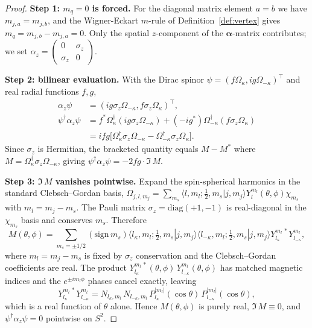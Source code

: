 \documentclass[11pt]{article}
\begin{document}
\begin{proof}
\textbf{Step 1: $m_q = 0$ is forced.}  For the diagonal matrix
element $a = b$ we have $m_{j,a} = m_{j,b}$, and the Wigner-Eckart
$m$-rule of Definition~\ref{def:vertex} gives $m_q = m_{j,b} -
m_{j,a} = 0$.  Only the spatial $z$-component of the
$\boldsymbol{\alpha}$-matrix contributes; we set
$\alpha_z = \begin{pmatrix} 0 & \sigma_z \\ \sigma_z & 0
\end{pmatrix}$.

\textbf{Step 2: bilinear evaluation.}  With the Dirac spinor
$\psi = (f \Omega_\kappa, i g \Omega_{-\kappa})^{\top}$ and real
radial functions $f, g$,
\begin{align*}
   \alpha_z \psi &= (i g \sigma_z \Omega_{-\kappa},
                     f \sigma_z \Omega_\kappa)^{\top}, \\
   \psi^{\dagger} \alpha_z \psi &=
      f^* \Omega_\kappa^{\dagger} (i g \sigma_z \Omega_{-\kappa})
      + (-i g^*) \Omega_{-\kappa}^{\dagger} (f \sigma_z \Omega_\kappa) \\
   &= i fg \bigl[\Omega_\kappa^{\dagger} \sigma_z \Omega_{-\kappa}
      - \Omega_{-\kappa}^{\dagger} \sigma_z \Omega_\kappa\bigr].
\end{align*}
Since $\sigma_z$ is Hermitian, the bracketed quantity equals
$M - M^*$ where $M = \Omega_\kappa^{\dagger} \sigma_z \Omega_{-\kappa}$,
giving $\psi^{\dagger} \alpha_z \psi = -2 fg \cdot \Im\,M$.

\textbf{Step 3: $\Im\,M$ vanishes pointwise.}  Expand the spin-spherical
harmonics in the standard Clebsch--Gordan basis,
$\Omega_{j, l, m_j} = \sum_{m_s} \langle l, m_l; \tfrac{1}{2}, m_s | j,
m_j \rangle Y_l^{m_l}(\theta, \phi) \chi_{m_s}$ with $m_l = m_j - m_s$.
The Pauli matrix $\sigma_z = \mathrm{diag}(+1, -1)$ is real-diagonal in
the $\chi_{m_s}$ basis and conserves $m_s$.  Therefore
\[
   M(\theta, \phi)
   = \sum_{m_s = \pm 1/2} (\mathrm{sign}\,m_s)
     \langle l_\kappa, m_l; \tfrac{1}{2}, m_s | j, m_j \rangle
     \langle l_{-\kappa}, m_l; \tfrac{1}{2}, m_s | j, m_j \rangle
     Y_{l_\kappa}^{m_l\,*} Y_{l_{-\kappa}}^{m_l},
\]
where $m_l = m_j - m_s$ is fixed by $\sigma_z$ conservation and the
Clebsch--Gordan coefficients are real.  The product
$Y_{l_\kappa}^{m_l\,*}(\theta, \phi)\, Y_{l_{-\kappa}}^{m_l}(\theta,
\phi)$ has matched magnetic indices and the $e^{\pm i m_l \phi}$
phases cancel exactly, leaving
\[
   Y_{l_\kappa}^{m_l\,*} Y_{l_{-\kappa}}^{m_l}
   = N_{l_\kappa, m_l}\, N_{l_{-\kappa}, m_l}\,
     P_{l_\kappa}^{|m_l|}(\cos\theta)\,
     P_{l_{-\kappa}}^{|m_l|}(\cos\theta),
\]
which is a real function of $\theta$ alone.  Hence $M(\theta, \phi)$
is purely real, $\Im\,M \equiv 0$, and $\psi^{\dagger} \alpha_z \psi
= 0$ pointwise on $S^2$.


\end{proof}
\end{document}
